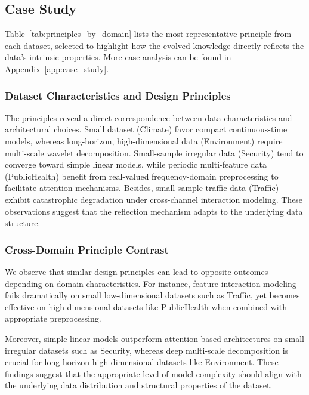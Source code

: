 \subsection{Case Study}

Table~\ref{tab:principles_by_domain} lists the most representative principle from each dataset, selected to highlight how the evolved knowledge directly reflects the data's intrinsic properties. More case analysis can be found in Appendix~\ref{app:case_study}.

\subsubsection{Dataset Characteristics and Design Principles}

The principles reveal a direct correspondence between data characteristics and architectural choices. Small dataset (Climate) favor compact continuous-time models, whereas long-horizon, high-dimensional data (Environment) require multi-scale wavelet decomposition. Small-sample irregular data (Security) tend to converge toward simple linear models, while periodic multi-feature data (PublicHealth) benefit from real-valued frequency-domain preprocessing to facilitate attention mechanisms. Besides, small-sample traffic data (Traffic) exhibit catastrophic degradation under cross-channel interaction modeling. These observations suggest that the reflection mechanism adapts to the underlying data structure.

\subsubsection{Cross-Domain Principle Contrast}

We observe that similar design principles can lead to opposite outcomes depending on domain characteristics. For instance, feature interaction modeling fails dramatically on small low-dimensional datasets such as Traffic, yet becomes effective on high-dimensional datasets like PublicHealth when combined with appropriate preprocessing.

Moreover, simple linear models outperform attention-based architectures on small irregular datasets such as Security, whereas deep multi-scale decomposition is crucial for long-horizon high-dimensional datasets like Environment. These findings suggest that the appropriate level of model complexity should align with the underlying data distribution and structural properties of the dataset.

